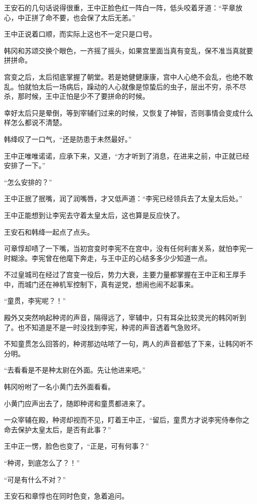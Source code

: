 王安石的几句话说得很重，王中正脸色红一阵白一阵，低头咬着牙道：“平章放心，中正拼了命不要，也会保了太后无恙。”

王中正说着口顺，而实际上这也不一定只是口号。

韩冈和苏颂交换个眼色，一齐摇了摇头，如果宫里面当真有变乱，保不准当真就要拼拼命。

宫变之后，太后彻底掌握了朝堂。若是她健健康康，宫中人心绝不会乱，也绝不敢乱。怕就怕太后一场病后，躁动的人心就像是惊蛰后的虫子，层出不穷，杀不尽杀，那时候，王中正怕是少不了要拼命的时候。

幸好太后只是晕倒，等到宰辅们过来的时候，又恢复了神智，否则事情会变成什么样怎么都说不清楚。

韩绛叹了一口气，“还是防患于未然最好。”

王中正唯唯诺诺，应承下来，又道，“方才听到了消息，在进来之前，中正就已经安排了一下。”

“怎么安排的？”

王中正抿了抿嘴，润了润嘴唇，才又低声道：“李宪已经领兵去了太皇太后处。”

王中正能想到让李宪去守着太皇太后，这也算是反应快了。

王安石和韩绛一起点了点头。

可章惇却啧了一下嘴，当初宫变时李宪不在宫中，没有任何利害关系，就怕李宪一时糊涂。李宪曾在他麾下奔走，与王中正的心结多多少少知道一点。

不过皇城司在经过了宫变一役后，势力大衰，主要力量都掌握在王中正和王厚手中，而城门还在神机军控制下，真有逆党，想闹也闹不起事来。

“童贯，李宪呢？！”

殿外又突然响起种谔的声音，隔得远了，宰辅中，只有耳朵比较灵光的韩冈听到了。也不知道是不是一时没找到李宪，种谔的声音透着气急败坏。

不知童贯怎么回答的，种谔那边咕哝了一句，两人的声音都低了下来，让韩冈听不分明。

“去看看是不是种太尉在外面。先让他进来吧。”

韩冈吩咐了一名小黄门去外面看看。

小黄门应声出去了，随即种谔和童贯都进来了。

一众宰辅在殿，种谔却视而不见，盯着王中正，“留后，童贯方才说李宪侍奉你之命去保护太皇太后，是否有此事？”

王中正一愣，脸色也变了，“正是，可有何事？”

“种谔，到底怎么了？！”

“可是有什么不对？”

王安石和章惇也在同时色变，急着追问。

